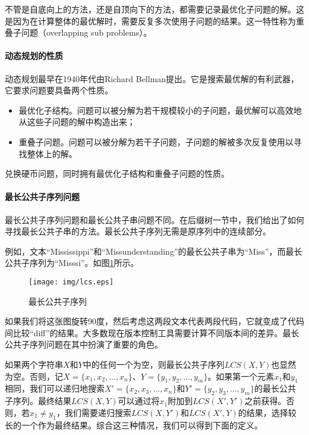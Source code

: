 \documentclass[UTF8]{article}
\begin{document}
不管是自底向上的方法，还是自顶向下的方法，都需要记录最优化子问题的解。这是因为在计算整体的最优解时，需要反复多次使用子问题的结果。这一特性称为重叠子问题（overlapping sub problems）。

\paragraph{动态规划的性质}

动态规划最早在1940年代由Richard Bellman提出。它是搜索最优解的有利武器，它要求问题要具备两个性质。

\begin{itemize}
\item 最优化子结构。问题可以被分解为若干规模较小的子问题，最优解可以高效地从这些子问题的解中构造出来；
\item 重叠子问题。问题可以被分解为若干子问题，子问题的解被多次反复使用以寻找整体上的解。
\end{itemize}

兑换硬币问题，同时拥有最优化子结构和重叠子问题的性质。

\paragraph{最长公共子序列问题}
 

最长公共子序列问题和最长公共子串问题不同。在后缀树一节中，我们给出了如何寻找最长公共子串的方法。最长公共子序列无需是原序列中的连续部分。

例如，文本“Mississippi”和“Missunderstanding”的最长公共子串为“Miss”，而最长公共子序列为“Misssi”。如图\ref{fig:lcs}所示。

\begin{figure}[htbp]
 \centering
 \texttt{[image: img/lcs.eps]}
 \caption{最长公共子序列}
 \label{fig:lcs}
\end{figure}

如果我们将这张图旋转90度，然后考虑这两段文本代表两段代码，它就变成了代码间比较“diff”的结果。大多数现在版本控制工具需要计算不同版本间的差异。最长公共子序列问题在其中扮演了重要的角色。

如果两个字符串$X$和$Y$中的任何一个为空，则最长公共子序列$LCS(X, Y)$也显然为空。否则，记$X = \{x_1, x_2, ..., x_n\}$、$Y = \{y_1, y_2, ..., y_m \}$。如果第一个元素$x_1$和$y_1$相同，我们可以递归地搜索$X' = \{x_2, x_3, ..., x_n \}$和$Y' = \{y_2, y_3, ..., y_m \}$的最长公共子序列。最终结果$LCS(X, Y)$可以通过将$x_1$附加到$LCS(X', Y')$之前获得。否则，若$x_1 \neq y_1$，我们需要递归搜索$LCS(X, Y')$和$LCS(X', Y)$的结果，选择较长的一个作为最终结果。综合这三种情况，我们可以得到下面的定义。
\end{document}
